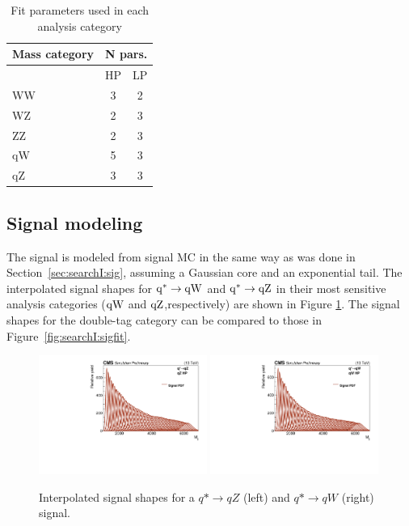 \begin{table}[htb]
\centering
\begin{tabular}{|l| c | c|}
\hline
Mass category & \multicolumn{2}{|c|}{N pars.}\\
\hline
& HP & LP \\
\hline
WW & 3 & 2 \\
WZ & 2 & 3 \\
ZZ & 2 & 3 \\
qW & 5 & 3 \\
qZ & 3 & 3 \\
\hline
\end{tabular}
\caption{Fit parameters used in each analysis category}
\label{tab:searchII:fitpars}
\end{table}

\subsection{Signal modeling}
The signal is modeled from signal MC in the same way as was done in Section~\ref{sec:searchI:sig}, assuming a Gaussian core and an exponential tail. The interpolated signal shapes for $\rm{q}^* \rightarrow \rm{q}\mathrm{W}$ and $\rm{q}^* \rightarrow \rm{q}\mathrm{Z}$ in their most sensitive analysis categories ($\rm{q}\mathrm{W}$ and $\rm{q}\mathrm{Z}$,respectively) are shown in Figure \ref{fig:searchII:interpolation}. The signal shapes for the double-tag category can be compared to those in Figure~\ref{fig:searchI:sigfit}.
\begin{figure}[h!]
\centering
\includegraphics[width=0.49\textwidth]{figures/analysis/search2/AN-16-235/plots/interpolation_QstarQZ_DijetMassHighPuriqZ.pdf}
\includegraphics[width=0.49\textwidth]{figures/analysis/search2/AN-16-235/plots/interpolation_QstarQW_DijetMassHighPuriqW.pdf}\\
\caption{Interpolated signal shapes for a  $q*\rightarrow qZ$ (left) and $q*\rightarrow qW$ (right) signal.}
\label{fig:searchII:interpolation}
\end{figure}

